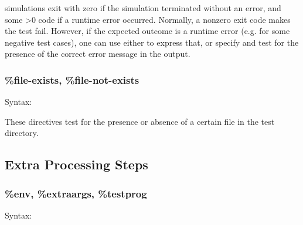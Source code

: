 {\opp} simulations exit with zero if the simulation terminated
without an error, and some >0 code if a runtime error occurred. Normally,
a nonzero exit code makes the test fail. However, if the expected outcome
is a runtime error (e.g. for some negative test cases), one can use either
 to express that, or specify 
and test for the presence of the correct error message in the output.



\subsubsection{\%file-exists, \%file-not-exists}
\label{sec:testing:opptest:file-exists}

Syntax:

\begin{filelisting}
\end{filelisting}

\begin{filelisting}
\end{filelisting}

These directives test for the presence or absence of a certain file in
the test directory.

\subsection{Extra Processing Steps}
\label{sec:testing:opptest:extra-processing-steps}

\subsubsection{\%env, \%extraargs, \%testprog}
\label{sec:testing:opptest:env-extraargs-testprog}

Syntax:

\begin{filelisting}
\end{filelisting}

\begin{filelisting}
\end{filelisting}

\begin{filelisting}
\end{filelisting}

